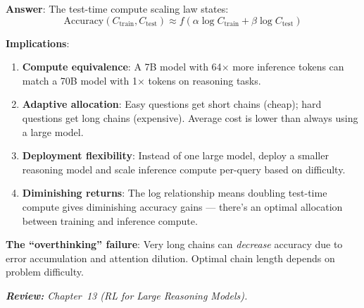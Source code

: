 \begin{questionbox}
\textbf{Answer}: The test-time compute scaling law states: 
\[
\text{Accuracy}(C_{\text{train}}, C_{\text{test}}) \approx f(\alpha \log C_{\text{train}} + \beta \log C_{\text{test}})
\]

\textbf{Implications}:

\begin{enumerate}
  \item \textbf{Compute equivalence}: A 7B model with 64$\times$ more inference tokens can match a 70B model with 1$\times$ tokens on reasoning tasks.
  \item \textbf{Adaptive allocation}: Easy questions get short chains (cheap); hard questions get long chains (expensive). Average cost is lower than always using a large model.
  \item \textbf{Deployment flexibility}: Instead of one large model, deploy a smaller reasoning model and scale inference compute per-query based on difficulty.
  \item \textbf{Diminishing returns}: The log relationship means doubling test-time compute gives diminishing accuracy gains --- there’s an optimal allocation between training and inference compute.
\end{enumerate}

\textbf{The ``overthinking'' failure}: Very long chains can \emph{decrease} accuracy due to error accumulation and attention dilution. Optimal chain length depends on problem difficulty.

\emph{\textbf{Review:} Chapter~13 (RL for Large Reasoning Models).}
\end{questionbox}

